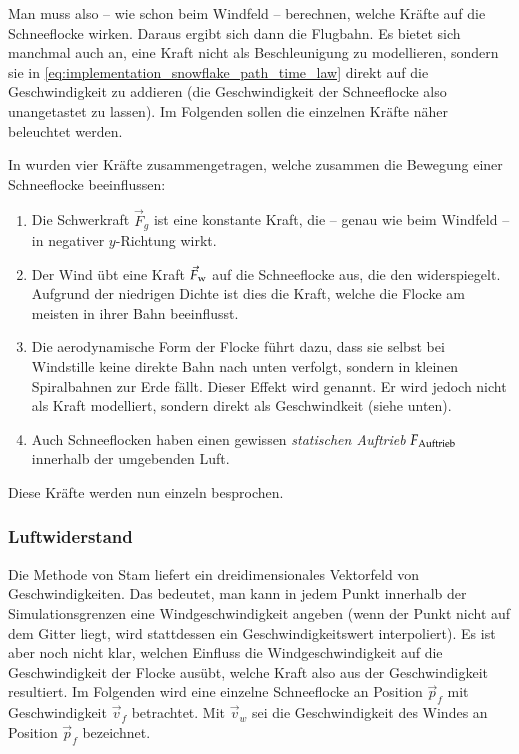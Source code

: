 Man muss also -- wie schon beim Windfeld -- berechnen, welche Kräfte
auf die Schneeflocke wirken. Daraus ergibt sich dann die Flugbahn. Es
bietet sich manchmal auch an, eine Kraft nicht als Beschleunigung zu
modellieren, sondern sie in
\autoref{eq:implementation_snowflake_path_time_law} direkt auf die
Geschwindigkeit zu addieren (die Geschwindigkeit der Schneeflocke also
unangetastet zu lassen). Im Folgenden sollen die einzelnen Kräfte
näher beleuchtet werden.

In \cite{Aagaard2004} wurden vier Kräfte zusammengetragen, welche
zusammen die Bewegung einer Schneeflocke beeinflussen:

\begin{enumerate}
\item Die Schwerkraft $\vec{F}_g$ ist eine konstante Kraft, die
-- genau wie beim Windfeld -- in negativer $y$-Richtung wirkt.
\item Der Wind übt eine Kraft $\vec{F}_{\textnormal{w}}$
auf die Schneeflocke aus, die den 
widerspiegelt. Aufgrund der niedrigen Dichte ist dies die Kraft,
welche die Flocke am meisten in ihrer Bahn beeinflusst.
\item Die aerodynamische Form der Flocke führt dazu, dass sie selbst bei
Windstille keine direkte Bahn nach unten verfolgt, sondern in kleinen
Spiralbahnen zur Erde fällt. Dieser Effekt wird
 genannt. Er wird jedoch nicht
als Kraft modelliert, sondern direkt als Geschwindkeit (siehe unten).
\item Auch Schneeflocken haben einen gewissen \emph{statischen
Auftrieb} $F_{\textnormal{Auftrieb}}$ innerhalb der umgebenden
Luft.
\end{enumerate}

Diese Kräfte werden nun einzeln besprochen.

\subsubsection{Luftwiderstand}

Die Methode von Stam liefert ein dreidimensionales Vektorfeld von
Geschwindigkeiten. Das bedeutet, man kann in jedem Punkt innerhalb der
Simulationsgrenzen eine Windgeschwindigkeit angeben (wenn der Punkt
nicht auf dem Gitter liegt, wird stattdessen ein Geschwindigkeitswert
interpoliert). Es ist aber noch nicht klar, welchen Einfluss die
Windgeschwindigkeit auf die Geschwindigkeit der Flocke ausübt, welche
Kraft also aus der Geschwindigkeit resultiert. Im Folgenden wird eine
einzelne Schneeflocke an Position $\vec{p}_f$ mit Geschwindigkeit
$\vec{v}_{f}$ betrachtet. Mit $\vec{v}_w$ sei die Geschwindigkeit des
Windes an Position $\vec{p}_f$ bezeichnet.

